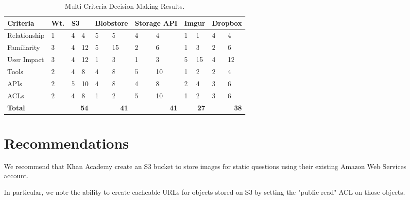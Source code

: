 \documentclass[se]{uw-wkrpt}
\begin{document}
\begin{table}
  \caption{Multi-Criteria Decision Making Results.}
  \label{tbl:mcdm}
  \centering
  \begin{tabular}{|p{3.0cm}|p{0.75cm}|
                   p{0.75cm}|p{0.75cm}|p{0.75cm}|p{0.75cm}|p{0.75cm}|
                   p{0.75cm}|p{0.75cm}|p{0.75cm}|p{0.75cm}|p{0.75cm}|}
    \hline
    \textbf{Criteria} &
    \textbf{Wt.} &
    \multicolumn{2}{|p{1.50cm}|}{\textbf{S3}} &
    \multicolumn{2}{|p{1.50cm}|}{\textbf{Blobstore}} &
    \multicolumn{2}{|p{1.50cm}|}{\textbf{Storage API}} &
    \multicolumn{2}{|p{1.50cm}|}{\textbf{Imgur}} &
    \multicolumn{2}{|p{1.50cm}|}{\textbf{Dropbox}} \\
    \hline
    \hline
    Relationship &
       1 &  4 &  4 &  5 &  5 &  4 &  4 &  1 &  1 &  4 &  4 \\
    \hline
    Familiarity &
       3 &  4 & 12 &  5 &  15 &  2 &  6 &  1 &  3 &  2 &  6 \\
    \hline
    User Impact &
       3 &  4 & 12 &  1 &  3 &  1 &  3 &  5 & 15 &  4 & 12 \\
    \hline
    Tools &
       2 &  4 &  8 &  4 &  8 &  5 & 10 &  1 &  2 &  2 &  4 \\
    \hline
    APIs &
       2 &  5 & 10 &  4 &  8 &  4 &  8 &  2 &  4 &  3 &  6 \\
    \hline
    ACLs &
       2 &  4 &  8 &  1 &  2 &  5 & 10 &  1 &  2 &  3 &  6 \\
    \hline
    \hline
    \textbf{Total} &
      &
      \multicolumn{2}{|r|}{\textbf{54}} &
      \multicolumn{2}{|r|}{\textbf{41}} &
      \multicolumn{2}{|r|}{\textbf{41}} &
      \multicolumn{2}{|r|}{\textbf{27}} &
      \multicolumn{2}{|r|}{\textbf{38}} \\
    \hline
  \end{tabular}
\end{table}

\section{Recommendations}
We recommend that Khan Academy create an S3 bucket to store images for static 
questions using their existing Amazon Web Services account.

In particular, we note the ability to create cacheable URLs for objects stored 
on S3 by setting the "public-read" ACL on those objects.
\end{document}
